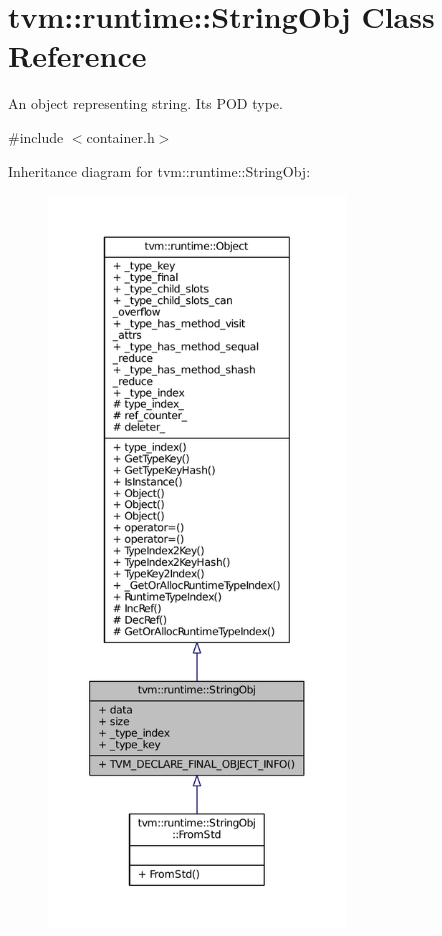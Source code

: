 \hypertarget{classtvm_1_1runtime_1_1StringObj}{}\section{tvm\+:\+:runtime\+:\+:String\+Obj Class Reference}
\label{classtvm_1_1runtime_1_1StringObj}


An object representing string. It\textquotesingle{}s P\+OD type.  




{\ttfamily \#include $<$container.\+h$>$}



Inheritance diagram for tvm\+:\+:runtime\+:\+:String\+Obj\+:
\nopagebreak
\begin{figure}[H]
\begin{center}
\leavevmode
\includegraphics[height=550pt]{classtvm_1_1runtime_1_1StringObj__inherit__graph}
\end{center}
\end{figure}


